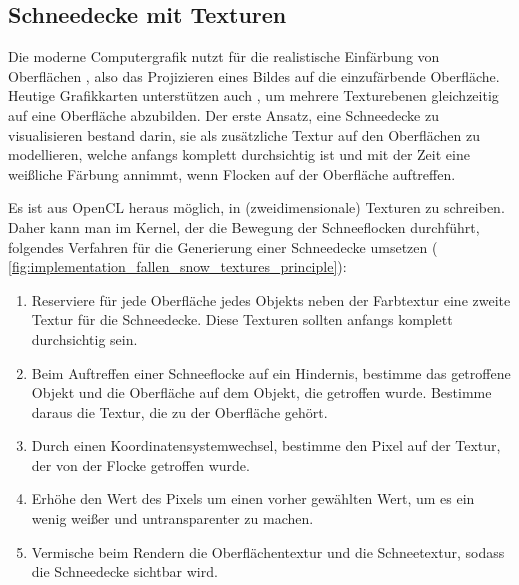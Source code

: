 \subsection{Schneedecke mit Texturen}
\label{sec:fallen_snow_with_textures}

Die moderne Computergrafik nutzt für die realistische Einfärbung von
Oberflächen , also das Projizieren
eines Bildes auf die einzufärbende Oberfläche. Heutige Grafikkarten
unterstützen auch , um mehrere
Texturebenen gleichzeitig auf eine Oberfläche abzubilden. Der erste
Ansatz, eine Schneedecke zu visualisieren bestand darin, sie als
zusätzliche Textur auf den Oberflächen zu modellieren, welche anfangs
komplett durchsichtig ist und mit der Zeit eine weißliche Färbung
annimmt, wenn Flocken auf der Oberfläche auftreffen.

Es ist aus OpenCL heraus möglich, in (zweidimensionale) Texturen zu
schreiben. Daher kann man im Kernel, der die Bewegung der
Schneeflocken durchführt, folgendes Verfahren für die Generierung
einer Schneedecke umsetzen (\Pimiddyvgl
\autoref{fig:implementation_fallen_snow_textures_principle}):

\begin{enumerate}
\item Reserviere für jede Oberfläche jedes Objekts neben der
Farbtextur eine zweite Textur für die Schneedecke. Diese Texturen sollten
anfangs komplett durchsichtig sein.
\item Beim Auftreffen einer Schneeflocke auf ein Hindernis, bestimme
das getroffene Objekt und die Oberfläche auf dem Objekt, die getroffen
wurde. Bestimme daraus die Textur, die zu der Oberfläche gehört.
\item Durch einen Koordinatensystemwechsel, bestimme den Pixel auf der
Textur, der von der Flocke getroffen wurde.
\item Erhöhe den Wert des Pixels um einen vorher gewählten Wert, um es
ein wenig weißer und untransparenter zu machen.
\item Vermische beim Rendern die Oberflächentextur und die
Schneetextur, sodass die Schneedecke sichtbar wird.
\end{enumerate}

